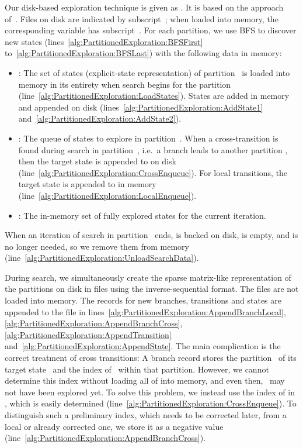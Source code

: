 \documentclass{llncs}
\newcommand{\ie}{i.e.\ }
\begin{document}
Our disk-based exploration technique is given as .
It is based on the approach of~\cite{BJ05,EK13}.
Files on disk are indicated by subscript~; when loaded into memory, the corresponding variable has subscript~.
For each partition, we use BFS to discover new states (lines~\ref{alg:PartitionedExploration:BFSFirst} to~\ref{alg:PartitionedExploration:BFSLast}) with the following data in memory:
\begin{itemize}
\item :
The set of states (explicit-state representation) of partition~ is loaded into memory in its entirety when search begins for the partition (line~\ref{alg:PartitionedExploration:LoadStates}).
States are added in memory and appended on disk (lines~\ref{alg:PartitionedExploration:AddState1} and~\ref{alg:PartitionedExploration:AddState2}).
\item :
The queue of states to explore in partition~.
When a cross-transition is found during search in partition~, \ie a branch leads to another partition , then the target state is appended to  on disk (line~\ref{alg:PartitionedExploration:CrossEnqueue}).
For local transitions, the target state is appended to  in memory (line~\ref{alg:PartitionedExploration:LocalEnqueue}).
\item :
The in-memory set of fully explored states for the current iteration.
\end{itemize}
When an iteration of search in partition~ ends,  is backed on disk,  is empty, and  is no longer needed, so we remove them from memory (line~\ref{alg:PartitionedExploration:UnloadSearchData}).

During search, we simultaneously create the sparse matrix-like representation of the partitions on disk in files  using the inverse-sequential format.
The files are not loaded into memory.
The records for new branches, transitions and states are appended to the file in lines~\ref{alg:PartitionedExploration:AppendBranchLocal}, \ref{alg:PartitionedExploration:AppendBranchCross}, \ref{alg:PartitionedExploration:AppendTransition} and~\ref{alg:PartitionedExploration:AppendState}.
The main complication is the correct treatment of cross transitions:
A branch record stores the partition~ of its target state~ and the index of~ within that partition.
However, we cannot determine this index without loading all of  into memory, and even then, ~may not have been explored yet.
To solve this problem, we instead use the index of  in , which is easily determined (line~\ref{alg:PartitionedExploration:CrossEnqueue}).
To distinguish such a preliminary index, which needs to be corrected later, from a local or already corrected one, we store it as a negative value (line~\ref{alg:PartitionedExploration:AppendBranchCross}).
\end{document}
